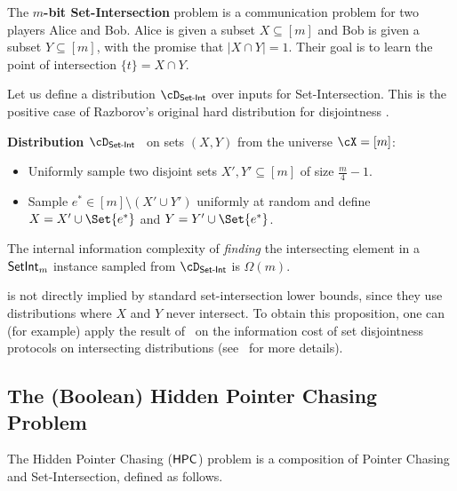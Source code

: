 \documentclass[11pt,letterpaper]{article}
\theoremstyle{definition}
\newcommand{\dsi}{\cD_\SI}
\newcommand{\estar}{e^{\ast}}
\newcommand{\hpc}{\ensuremath{\textnormal{\textsf{HPC}}}\xspace}
\newcommand{\setint}{\ensuremath{\textnormal{\textsf{SetInt}}}\xspace}
\newenvironment{tbox}{\begin{tcolorbox}[
		enlarge top by=5pt,
		enlarge bottom by=5pt,
		 breakable,
		 boxsep=0pt,
                  left=4pt,
                  right=4pt,
                  top=10pt,
                  boxrule=1pt,toprule=1pt,
                  colback=white,
                  arc=-1pt,
                  ]%
	}
{\end{tcolorbox}}
\newcommand{\SI}{\ensuremath{\textnormal{\textsf{Set-Int}}}\xspace}
\begin{document}
\begin{definition}
    The \textbf{$m$-bit Set-Intersection} problem is a communication problem
    for two players Alice and Bob.
    Alice is given a subset $X \subseteq [m]$ and Bob is given a subset
    $Y \subseteq [m]$, with the promise that $|X \cap Y| = 1$.
    Their goal is to learn the point of intersection $\{t\} = X \cap Y$. 
\end{definition}

Let us define a distribution $\cD_\SI$ over inputs for Set-Intersection. This is the positive case of Razborov's original hard distribution for disjointness \cite{Razborov92}.

\begin{tbox}
    \textbf{Distribution $\cD_\SI$}~\cite{AssadiR20} on sets
    $(X, Y)$ from the universe $\cX=[m]$: 

    \begin{itemize}
    \item Uniformly sample two disjoint sets $X', Y' \subseteq [m]$ of size
      $\frac m 4 - 1$.
    \item Sample $\estar \in [m]\setminus(X' \cup Y')$ uniformly at random
      and define $X = X' \cup \Set{\estar}$ and $Y = Y' \cup \Set{\estar}$.
\end{itemize}
\end{tbox}

\begin{proposition}\label{prop:SI-hard}
  The internal information complexity of \emph{finding} the intersecting element
  in a $\setint_m$ instance sampled from $\dsi$ is $\Omega(m)$.
\end{proposition}

 is not directly implied by standard set-intersection lower
bounds, since they use distributions where $X$ and $Y$ never intersect.
To obtain this proposition, one can (for example) apply the result
of~\cite{JayramKS03} on the information cost of set disjointness protocols on
intersecting distributions (see~\cite{AssadiCK19} for more details).

\subsection{The (Boolean) Hidden Pointer Chasing Problem}

The Hidden Pointer Chasing ($\hpc$) problem is a composition of Pointer Chasing and Set-Intersection, defined as follows.
\end{document}
